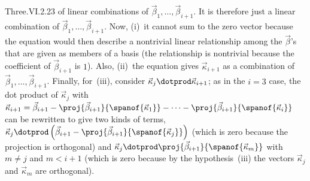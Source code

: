 \begin{ans}{Three.VI.2.23}
       of linear combinations of $\vec{\beta}_1,\dots,\vec{\beta}_{i+1}$.
       It is therefore just a
       linear combination of $\vec{\beta}_1,\dots,\vec{\beta}_{i+1}$.
       Now, (i)~it cannot sum to the zero vector because the equation would
       then describe a nontrivial linear relationship among the $\vec{\beta}$'s
       that are given as members of a basis
       (the relationship is nontrivial because the coefficient of
       $\vec{\beta}_{i+1}$ is $1$).
       Also, (ii)~the equation gives $\vec{\kappa}_{i+1}$ as a combination of
       $\vec{\beta}_1,\dots,\vec{\beta}_{i+1}$.
       Finally, for~(iii), consider $\vec{\kappa}_j\dotprod\vec{\kappa}_{i+1}$;
       as in the $i=3$ case, the dot product of $\vec{\kappa}_j$ with
       $\vec{\kappa}_{i+1}=\vec{\beta}_{i+1}
          -\proj{\vec{\beta}_{i+1}}{\spanof{\vec{\kappa}_1}}
          -\dots
          -\proj{\vec{\beta}_{i+1}}{\spanof{\vec{\kappa}_i}}$
        can be rewritten to give two kinds of terms,
       $\vec{\kappa}_j\dotprod
           \left(\vec{\beta}_{i+1}
                  -\proj{\vec{\beta}_{i+1}}{\spanof{\vec{\kappa}_j}}
           \right)$
       (which is zero because the projection is orthogonal)
       and
       $\vec{\kappa}_j\dotprod
               \proj{\vec{\beta}_{i+1}}{\spanof{\vec{\kappa}_m}}$
       with $m\neq j$ and $m<i+1$
       (which is zero because by the hypothesis~(iii)
       the vectors $\vec{\kappa}_j$ and $\vec{\kappa}_m$ are orthogonal).
     
\end{ans}
